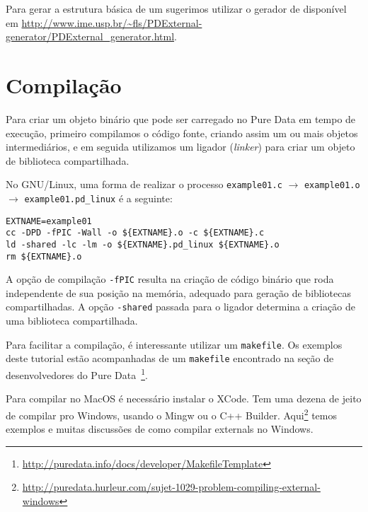 Para gerar a estrutura básica de um \external sugerimos utilizar o gerador de
\external disponível em \url{http://www.ime.usp.br/~fls/PDExternal-generator/PDExternal_generator.html}.

\section{Compilação}
\label{sec:compiling}

Para criar um objeto binário que pode ser carregado no Pure Data em tempo de
execução, primeiro compilamos o código fonte, criando assim um ou mais objetos
intermediários, e em seguida utilizamos um ligador (\emph{linker}) para criar
um objeto de biblioteca compartilhada.

No GNU/Linux, uma forma de realizar o processo
\texttt{example01.c} $\rightarrow$ \texttt{example01.o} $\rightarrow$
\texttt{example01.pd\_linux} é a seguinte:

\vspace{1em}
\begin{lstlisting}[caption=Compilação de um objeto]
EXTNAME=example01
cc -DPD -fPIC -Wall -o ${EXTNAME}.o -c ${EXTNAME}.c
ld -shared -lc -lm -o ${EXTNAME}.pd_linux ${EXTNAME}.o
rm ${EXTNAME}.o
\end{lstlisting}

A opção de compilação \texttt{-fPIC} resulta na criação de código binário que
roda independente de sua posição na memória, adequado para geração de
bibliotecas compartilhadas. A opção \texttt{-shared} passada para o ligador
determina a criação de uma biblioteca compartilhada.

Para facilitar a compilação, é interessante utilizar um \texttt{makefile}.
Os exemplos deste tutorial estão acompanhadas de um \texttt{makefile} encontrado
na seção de desenvolvedores do Pure
Data~\footnote{\url{http://puredata.info/docs/developer/MakefileTemplate}}.

Para compilar \externals no MacOS é necessário instalar o XCode.
Tem uma dezena de jeito de compilar pro Windows, usando o Mingw ou o C++ Builder.
Aqui\footnote{\url{http://puredata.hurleur.com/sujet-1029-problem-compiling-external-windows}}
temos exemplos e muitas discussões de como compilar externals no Windows.


